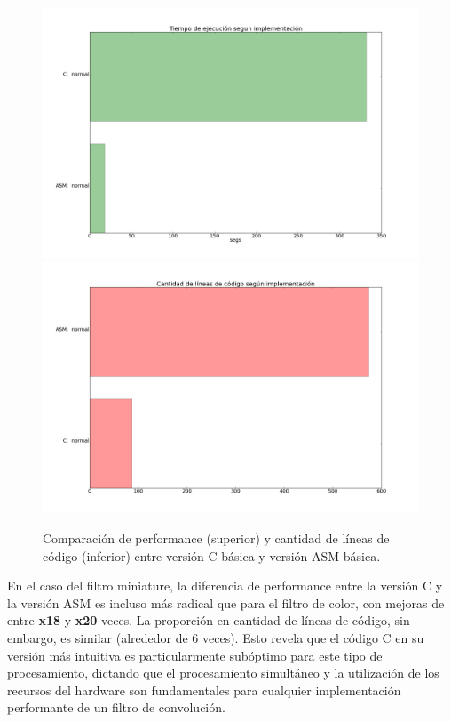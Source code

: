 \begin{figure}[H]
\begin{center}
  \includegraphics[scale=0.35]{secciones/filtro_miniature/graficos/C_ASM_perf.png}
  \includegraphics[scale=0.35]{secciones/filtro_miniature/graficos/C_ASM_loc.png}
\end{center}
\caption{Comparación de performance (superior) y cantidad de líneas de código (inferior) entre versión C básica y versión ASM básica.}
\label{fig:filtro-miniature-C-vs-ASM}
\end{figure}

En el caso del filtro miniature, la diferencia de performance entre la versión C y la versión ASM es incluso más radical que para el filtro de color, con mejoras de entre \textbf{x18} y \textbf{x20} veces. La proporción en cantidad de líneas de código, sin embargo, es similar (alrededor de 6 veces). Esto revela que el código C en su versión más intuitiva es particularmente subóptimo para este tipo de procesamiento, dictando que el procesamiento simultáneo y la utilización de los recursos del hardware son fundamentales para cualquier implementación performante de un filtro de convolución.

